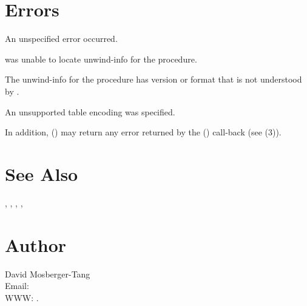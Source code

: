\documentclass{article}
\begin{document}
\section{Errors}

\begin{Description}
\item[\Const{UNW\_EUNSPEC}] An unspecified error occurred.
\item[\Const{UNW\_ENOINFO}]  was unable to locate
  unwind-info for the procedure.
\item[\Const{UNW\_EBADVERSION}] The unwind-info for the procedure has
  version or format that is not understood by .
\item[\Const{UNW\_EINVAL}] An unsupported table encoding was specified.
\end{Description}
In addition, () may return any
error returned by the () call-back (see
(3)).

\section{See Also}

,
,
,
,

\section{Author}

\noindent
David Mosberger-Tang\\
Email: \\
WWW: .
\LatexManEnd
\end{document}
